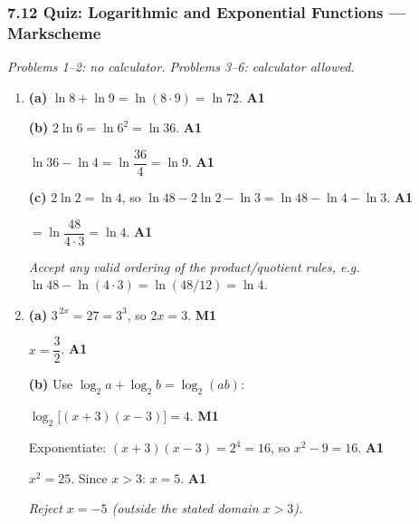 \documentclass[12pt, twoside]{article}
\begin{document}
\subsubsection*{7.12 Quiz: Logarithmic and Exponential Functions ---
Markscheme}

\textit{\small Problems 1--2: no calculator. Problems 3--6: calculator
allowed.}

\begin{enumerate}[itemsep=0.3cm]

\item[1.] [Maximum mark: 5]

\medskip

\textbf{(a)} $\ln 8 + \ln 9 = \ln(8 \cdot 9) = \ln 72$. \hfill \textbf{A1}

\medskip

\textbf{(b)} $2\ln 6 = \ln 6^{2} = \ln 36$. \hfill \textbf{A1}

$\ln 36 - \ln 4 = \ln\dfrac{36}{4} = \ln 9$. \hfill \textbf{A1}

\medskip

\textbf{(c)} $2\ln 2 = \ln 4$, so
$\ln 48 - 2\ln 2 - \ln 3 = \ln 48 - \ln 4 - \ln 3$. \hfill \textbf{A1}

$= \ln\dfrac{48}{4 \cdot 3} = \ln 4$. \hfill \textbf{A1}

\emph{Accept any valid ordering of the product/quotient rules, e.g.\
$\ln 48 - \ln(4 \cdot 3) = \ln(48/12) = \ln 4$.}

\newpage

\item[2.] [Maximum mark: 5]

\medskip

\textbf{(a)} $3^{\,2x} = 27 = 3^{3}$, so $2x = 3$. \hfill \textbf{M1}

$x = \dfrac{3}{2}$. \hfill \textbf{A1}

\medskip

\textbf{(b)} Use $\log_{2} a + \log_{2} b = \log_{2}(ab)$:

$\log_{2}\!\bigl[(x+3)(x-3)\bigr] = 4$. \hfill \textbf{M1}

Exponentiate: $(x+3)(x-3) = 2^{4} = 16$, so $x^{2} - 9 = 16$.
\hfill \textbf{A1}

$x^{2} = 25$. Since $x > 3$: $x = 5$. \hfill \textbf{A1}

\emph{Reject $x = -5$ (outside the stated domain $x > 3$).}


\end{enumerate}
\end{document}
